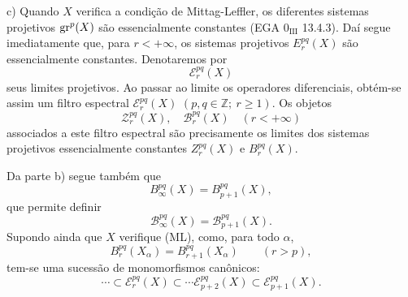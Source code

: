 c) Quando \(X\) verifica a condição de Mittag-Leffler, os diferentes sistemas projetivos \(\operatorname{gr}^p(X)\) são essencialmente constantes (EGA \(0_{\mathrm{III}}\) 13.4.3). Daí segue imediatamente que, para \(r<+\infty\), os sistemas projetivos \(E_r^{pq}(X)\) são essencialmente constantes. Denotaremos por
\[
\mathcal E_r^{pq}(X)
\]
seus limites projetivos. Ao passar ao limite os operadores diferenciais, obtém-se assim um filtro espectral \(\mathcal E_r^{pq}(X)\) \((p,q\in\mathbb Z;\ r\ge1)\). Os objetos
\[
\mathcal Z_r^{pq}(X),\quad \mathcal B_r^{pq}(X)\quad(r<+\infty)
\]
associados a este filtro espectral são precisamente os limites dos sistemas projetivos essencialmente constantes \(Z_r^{pq}(X)\) e \(B_r^{pq}(X)\).

Da parte b) segue também que
\[
B_\infty^{pq}(X)=B_{p+1}^{pq}(X),
\]
que permite definir
\[
\mathcal B_\infty^{pq}(X)=\mathcal B_{p+1}^{pq}(X).
\]
Supondo ainda que \(X\) verifique (ML), como, para todo \(\alpha\),
\[
B_r^{pq}(X_\alpha)=B_{r+1}^{pq}(X_\alpha)\qquad(r>p),
\]
tem-se uma sucessão de monomorfismos canônicos:
\begin{equation}
\cdots\subset\mathcal E_r^{pq}(X)\subset\cdots\mathcal E_{p+2}^{pq}(X)\subset\mathcal E_{p+1}^{pq}(X).
\tag{S}
\end{equation}
